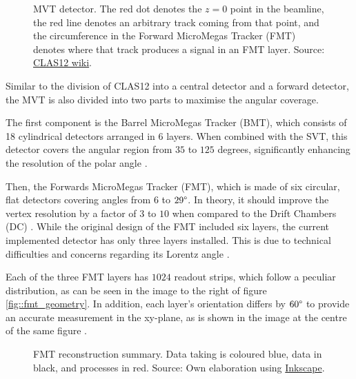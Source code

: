     \begin{figure}[b!]
        \centering{}
        \caption[MVT detector.]{MVT detector.
        The red dot denotes the $z=0$ point in the beamline, the red line denotes an arbitrary track coming from that point, and the circumference in the Forward MicroMegas Tracker (FMT) denotes where that track produces a signal in an FMT layer.
        Source: \hyperlink{jlab.org/physics/hall-b/clas12}{CLAS12 wiki}.}
        \label{fig::mvt}
    \end{figure}

    Similar to the division of CLAS12 into a central detector and a forward detector, the MVT is also divided into two parts to maximise the angular coverage.

    The first component is the Barrel MicroMegas Tracker (BMT), which consists of 18 cylindrical detectors arranged in 6 layers.
    When combined with the SVT, this detector covers the angular region from $35$ to $125$ degrees, significantly enhancing the resolution of the polar angle \cite{acker2020mvt}.

    Then, the Forwards MicroMegas Tracker (FMT), which is made of six circular, flat detectors covering angles from $6$ to $29\degree$.
    In theory, it should improve the vertex resolution by a factor of $3$ to $10$ when compared to the Drift Chambers (DC) \cite{aune2009}.
    While the original design of the FMT included six layers, the current implemented detector has only three layers installed.
    This is due to technical difficulties and concerns regarding its Lorentz angle \cite{konczykowski2010}.

    Each of the three FMT layers has $1024$ readout strips, which follow a peculiar distribution, as can be seen in the image to the right of figure \ref{fig::fmt_geometry}.
    In addition, each layer's orientation differs by $60\degree$ to provide an accurate measurement in the xy-plane, as is shown in the image at the centre of the same figure \cite{acker2020mvt}.

    \begin{wrapfigure}{r}{0.50\textwidth}
        \centering{}
        \caption[FMT reconstruction summary]{FMT reconstruction summary.
        Data taking is coloured blue, data in black, and processes in red.
        Source: Own elaboration using \hyperlink{inkscape.org/}{Inkscape}.}
        \label{fig::fmt_recon}
    \end{wrapfigure}

